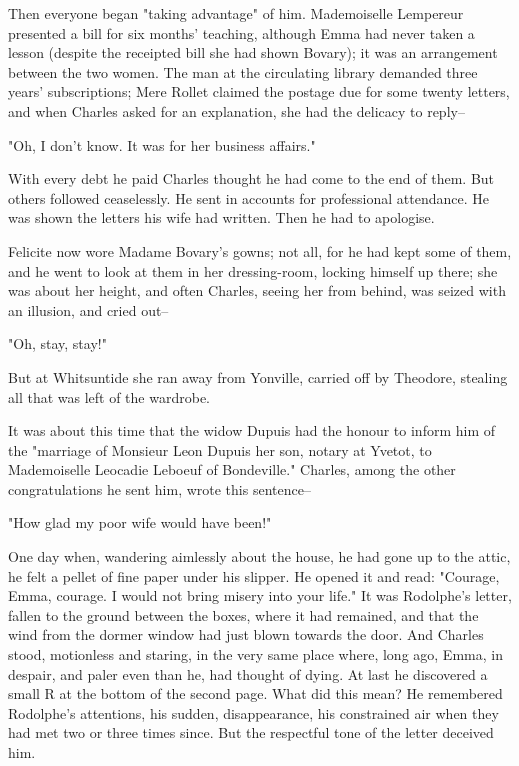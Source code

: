 \documentclass[11pt,twocolumn]{ltugboat}
\begin{document}
Then everyone began "taking advantage" of him. Mademoiselle Lempereur
presented a bill for six months' teaching, although Emma had never taken
a lesson (despite the receipted bill she had shown Bovary); it was an
arrangement between the two women. The man at the circulating library
demanded three years' subscriptions; Mere Rollet claimed the postage due
for some twenty letters, and when Charles asked for an explanation, she
had the delicacy to reply--

"Oh, I don't know. It was for her business affairs."

With every debt he paid Charles thought he had come to the end of them.
But others followed ceaselessly. He sent in accounts for professional
attendance. He was shown the letters his wife had written. Then he had
to apologise.

Felicite now wore Madame Bovary's gowns; not all, for he had kept some
of them, and he went to look at them in her dressing-room, locking
himself up there; she was about her height, and often Charles, seeing
her from behind, was seized with an illusion, and cried out--

"Oh, stay, stay!"

But at Whitsuntide she ran away from Yonville, carried off by Theodore,
stealing all that was left of the wardrobe.

It was about this time that the widow Dupuis had the honour to inform
him of the "marriage of Monsieur Leon Dupuis her son, notary at Yvetot,
to Mademoiselle Leocadie Leboeuf of Bondeville." Charles, among the
other congratulations he sent him, wrote this sentence--

"How glad my poor wife would have been!"

One day when, wandering aimlessly about the house, he had gone up to the
attic, he felt a pellet of fine paper under his slipper. He opened it
and read: "Courage, Emma, courage. I would not bring misery into your
life." It was Rodolphe's letter, fallen to the ground between the boxes,
where it had remained, and that the wind from the dormer window had just
blown towards the door. And Charles stood, motionless and staring, in
the very same place where, long ago, Emma, in despair, and paler even
than he, had thought of dying. At last he discovered a small R at the
bottom of the second page. What did this mean? He remembered Rodolphe's
attentions, his sudden, disappearance, his constrained air when they
had met two or three times since. But the respectful tone of the letter
deceived him.
\end{document}
